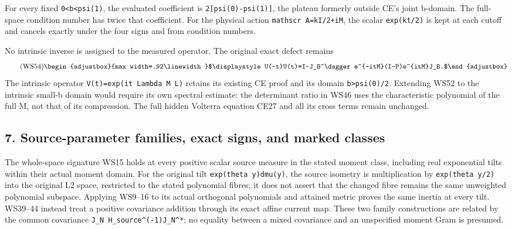 \documentclass[11pt]{article}
\begin{document}
 For every fixed \texttt{0\textless{}b\textless{}psi(1)}, the evaluated coefficient is \texttt{2{[}psi(0)-psi(1){]}}, the plateau formerly outside CE's joint b-domain. The full-space condition number has twice that coefficient. For the physical action \texttt{mathscr A=\allowbreak{}kI/\allowbreak{}2+iM}, the scalar \texttt{exp(kt/\allowbreak{}2)} is kept at each cutoff and cancels exactly under the four signs and from condition numbers.

No intrinsic inverse is assigned to the measured operator. The original exact defect remains 
\begin{equation*}
\tag{WS54}
\begin{adjustbox}{max width=.92\linewidth}$\displaystyle U(-t)U(t)=I-J_B^\dagger e^{-itM}(I-P)e^{itM}J_B.$\end{adjustbox}
\end{equation*}
 The intrinsic operator \texttt{V(t)=\allowbreak{}exp(it Lambda M L)} retains its existing CE proof and its domain \texttt{b\textgreater{}psi(0)/\allowbreak{}2}. Extending WS52 to the intrinsic small-b domain would require its own spectral estimate: the determinant ratio in WS46 uses the characteristic polynomial of the full M, not that of its compression. The full hidden Volterra equation CE27 and all its cross terms remain unchanged.

\subsection{7. Source-parameter families, exact signs, and marked classes}\label{part3-source-parameter-families-exact-signs-and-marked-classes}

The whole-space signature WS15 holds at every positive scalar source measure in the stated moment class, including real exponential tilts within their actual moment domain. For the original tilt \texttt{exp(theta y)dmu(y)}, the source isometry is multiplication by \texttt{exp(theta y/\allowbreak{}2)} into the original L2 space, restricted to the stated polynomial fibres; it does not assert that the changed fibre remains the same unweighted polynomial subspace. Applying WS9--16 to its actual orthogonal polynomials and attained metric proves the same inertia at every tilt. WS39--44 instead treat a positive covariance addition through its exact affine current map. These two family constructions are related by the common covariance \texttt{J\_\allowbreak{}N H\_\allowbreak{}source\^{}(-1)J\_\allowbreak{}N\^{}*}; no equality between a mixed covariance and an unspecified moment Gram is presumed.
\end{document}

